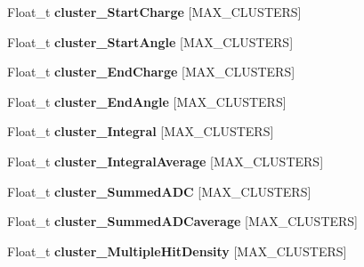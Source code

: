 \begin{DoxyCompactItemize}
\item 
\hypertarget{classanatree_a793a4a4bae0507a4ba0e9792a76c15f9}{Float\-\_\-t {\bfseries cluster\-\_\-\-Start\-Charge} \mbox{[}M\-A\-X\-\_\-\-C\-L\-U\-S\-T\-E\-R\-S\mbox{]}}\label{classanatree_a793a4a4bae0507a4ba0e9792a76c15f9}

\item 
\hypertarget{classanatree_a635037cd901f82f5989db10754a3daaa}{Float\-\_\-t {\bfseries cluster\-\_\-\-Start\-Angle} \mbox{[}M\-A\-X\-\_\-\-C\-L\-U\-S\-T\-E\-R\-S\mbox{]}}\label{classanatree_a635037cd901f82f5989db10754a3daaa}

\item 
\hypertarget{classanatree_a8ff61ed4971f8971c8dcd7864f8365a6}{Float\-\_\-t {\bfseries cluster\-\_\-\-End\-Charge} \mbox{[}M\-A\-X\-\_\-\-C\-L\-U\-S\-T\-E\-R\-S\mbox{]}}\label{classanatree_a8ff61ed4971f8971c8dcd7864f8365a6}

\item 
\hypertarget{classanatree_a78a610702659e215d108a77093d55962}{Float\-\_\-t {\bfseries cluster\-\_\-\-End\-Angle} \mbox{[}M\-A\-X\-\_\-\-C\-L\-U\-S\-T\-E\-R\-S\mbox{]}}\label{classanatree_a78a610702659e215d108a77093d55962}

\item 
\hypertarget{classanatree_ac129a3af06f26d24412a2d586870876b}{Float\-\_\-t {\bfseries cluster\-\_\-\-Integral} \mbox{[}M\-A\-X\-\_\-\-C\-L\-U\-S\-T\-E\-R\-S\mbox{]}}\label{classanatree_ac129a3af06f26d24412a2d586870876b}

\item 
\hypertarget{classanatree_a378a2760d90681d32eae8e58ee2fbc4d}{Float\-\_\-t {\bfseries cluster\-\_\-\-Integral\-Average} \mbox{[}M\-A\-X\-\_\-\-C\-L\-U\-S\-T\-E\-R\-S\mbox{]}}\label{classanatree_a378a2760d90681d32eae8e58ee2fbc4d}

\item 
\hypertarget{classanatree_a397a20760df6b185d51e4ec05a2c3cc2}{Float\-\_\-t {\bfseries cluster\-\_\-\-Summed\-A\-D\-C} \mbox{[}M\-A\-X\-\_\-\-C\-L\-U\-S\-T\-E\-R\-S\mbox{]}}\label{classanatree_a397a20760df6b185d51e4ec05a2c3cc2}

\item 
\hypertarget{classanatree_ae92ddb9730100551d6f56993330895d9}{Float\-\_\-t {\bfseries cluster\-\_\-\-Summed\-A\-D\-Caverage} \mbox{[}M\-A\-X\-\_\-\-C\-L\-U\-S\-T\-E\-R\-S\mbox{]}}\label{classanatree_ae92ddb9730100551d6f56993330895d9}

\item 
\hypertarget{classanatree_a0ba0ad2840d19d34be27051d33438d1d}{Float\-\_\-t {\bfseries cluster\-\_\-\-Multiple\-Hit\-Density} \mbox{[}M\-A\-X\-\_\-\-C\-L\-U\-S\-T\-E\-R\-S\mbox{]}}\label{classanatree_a0ba0ad2840d19d34be27051d33438d1d}


\end{DoxyCompactItemize}
